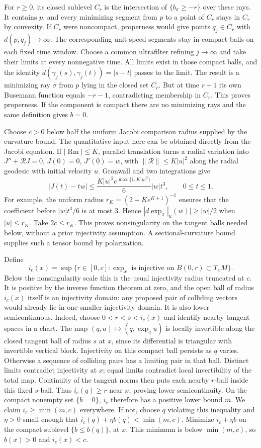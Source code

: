For $r\geq0$, its closed sublevel $C_r$ is the intersection of
$\{b_\sigma\geq-r\}$ over these rays.  It contains $p$, and every
minimizing segment from $p$ to a point of $C_r$ stays in $C_r$ by
convexity.  If $C_r$ were noncompact, properness would give points
$q_j\in C_r$ with $d(p,q_j)\to\infty$.  The corresponding
unit-speed segments stay in compact balls on each fixed time window.
Choose a common ultrafilter refining $j\to\infty$ and take
their limits at every nonnegative time.  All limits exist in those
compact balls, and the identity
$d(\gamma_j(s),\gamma_j(t))=|s-t|$ passes to the limit.  The
result is a minimizing ray $\sigma$ from $p$ lying in the closed
set $C_r$.  But at time $r+1$ its own Busemann function equals
$-r-1$, contradicting membership in $C_r$.  This proves properness.
If the component is compact there are no minimizing rays and the
same definition gives $b=0$.

Choose $c>0$ below half the uniform Jacobi comparison radius supplied
by the curvature bound.  The quantitative input here can be obtained
directly from the Jacobi equation.  If $|\operatorname{Rm}|\leq K$, parallel
translation turns a radial variation into
$J''+\mathcal R J=0$, $J(0)=0$, $J'(0)=w$, with
$\|\mathcal R\|\leq K|u|^2$ along the radial geodesic with
initial velocity $u$.  Gronwall and two integrations give
\[
 |J(t)-tw|\leq
 \frac{K|u|^2e^{\max\{1,K|u|^2\}}}{6}|w|t^3,
 \qquad 0\leq t\leq1.
\]
For example, the uniform radius
$r_K=(2+Ke^{K+1})^{-1}$ ensures that the coefficient before
$|w|t^3/6$ is at most $3$.  Hence
$|d\exp_x|_u(w)|\geq|w|/2$ when $|u|\leq r_K$.
Take $2c\leq r_K$.  This proves nonsingularity on the tangent
balls needed below, without a prior injectivity assumption.  A
sectional-curvature bound supplies such a tensor bound by polarization.

Define
\[
 i_c(x)=\sup\{r\in[0,c]:\exp_x\text{ is injective on }B(0,r)
                       \subset T_xM\}.
\]
Below the nonsingularity scale this is the usual injectivity radius
truncated at $c$.  It is positive by the inverse function theorem at
zero, and the open ball of radius $i_c(x)$ itself is an injectivity
domain: any proposed pair of colliding vectors would already lie in
one smaller injectivity domain.
It is also lower semicontinuous.  Indeed, choose
$0<r<s<i_c(x)$ and identify nearby tangent spaces in a chart.
The map $(q,u)\mapsto(q,\exp_q u)$ is locally invertible along
the closed tangent ball of radius $s$ at $x$, since its differential
is triangular with invertible vertical block.  Injectivity on this
compact ball persists as $q$ varies.  Otherwise a sequence of
colliding pairs has a limiting pair in that ball.  Distinct limits
contradict injectivity at $x$; equal limits contradict local
invertibility of the total map.  Continuity of the tangent norms
then puts each nearby $r$-ball inside this fixed $s$-ball.  Thus
$i_c(q)\geq r$ near $x$, proving lower semicontinuity.
On the compact nonempty set $\{b=0\}$, $i_c$ therefore has a
positive lower bound $m$.  We claim
$i_c\geq\min(m,c)$ everywhere.  If not, choose $q$ violating this
inequality and $\eta>0$ small enough that
$i_c(q)+\eta b(q)<\min(m,c)$.  Minimize $i_c+\eta b$ on the compact
sublevel $\{b\leq b(q)\}$, at $x$.  This minimum is below $\min(m,c)$,
so $b(x)>0$ and $i_c(x)<c$.

